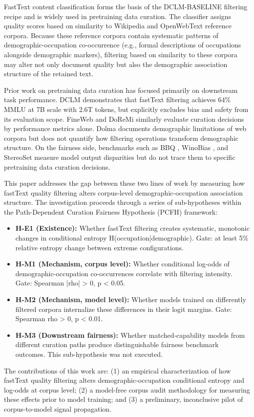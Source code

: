 
FastText content classification forms the basis of the DCLM-BASELINE filtering recipe \citep{Li2024DCLM} and is widely used in pretraining data curation. The classifier assigns quality scores based on similarity to Wikipedia and OpenWebText reference corpora. Because these reference corpora contain systematic patterns of demographic-occupation co-occurrence (e.g., formal descriptions of occupations alongside demographic markers), filtering based on similarity to these corpora may alter not only document quality but also the demographic association structure of the retained text.

Prior work on pretraining data curation has focused primarily on downstream task performance. DCLM \citep{Li2024DCLM} demonstrates that fastText filtering achieves 64\% MMLU at 7B scale with 2.6T tokens, but explicitly excludes bias and safety from its evaluation scope. FineWeb \citep{Penedo2024FineWeb} and DoReMi \citep{Xie2023DoReMi} similarly evaluate curation decisions by performance metrics alone. Dolma \citep{Soldaini2024Dolma} documents demographic limitations of web corpora but does not quantify how filtering operations transform demographic structure. On the fairness side, benchmarks such as BBQ \citep{Parrish2022BBQ}, WinoBias \citep{Zhao2018WinoBias}, and StereoSet \citep{Nadeem2021StereoSet} measure model output disparities but do not trace them to specific pretraining data curation decisions.

This paper addresses the gap between these two lines of work by measuring how fastText quality filtering alters corpus-level demographic-occupation association structure. The investigation proceeds through a series of sub-hypotheses within the Path-Dependent Curation Fairness Hypothesis (PCFH) framework:

\begin{itemize}
\item \textbf{H-E1 (Existence):} Whether fastText filtering creates systematic, monotonic changes in conditional entropy H(occupation|demographic). Gate: at least 5\% relative entropy change between extreme configurations.
\item \textbf{H-M1 (Mechanism, corpus level):} Whether conditional log-odds of demographic-occupation co-occurrences correlate with filtering intensity. Gate: Spearman |rho| > 0, p < 0.05.
\item \textbf{H-M2 (Mechanism, model level):} Whether models trained on differently filtered corpora internalize these differences in their logit margins. Gate: Spearman rho > 0, p < 0.01.
\item \textbf{H-M3 (Downstream fairness):} Whether matched-capability models from different curation paths produce distinguishable fairness benchmark outcomes. This sub-hypothesis was not executed.
\end{itemize}

The contributions of this work are: (1) an empirical characterization of how fastText quality filtering alters demographic-occupation conditional entropy and log-odds at corpus level; (2) a model-free corpus audit methodology for measuring these effects prior to model training; and (3) a preliminary, inconclusive pilot of corpus-to-model signal propagation.


